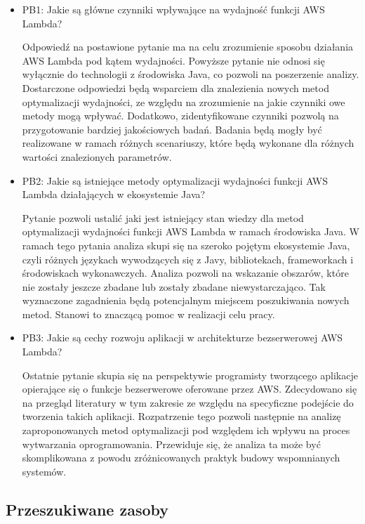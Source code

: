 \begin{itemize}
    \item PB1: Jakie są główne czynniki wpływające na wydajność funkcji AWS Lambda?
    
    Odpowiedź na postawione pytanie ma na celu zrozumienie sposobu działania AWS Lambda pod kątem wydajności.
    Powyższe pytanie nie odnosi się wyłącznie do technologii z środowiska Java, co pozwoli na poszerzenie analizy.
    Dostarczone odpowiedzi będą wsparciem dla znalezienia nowych metod optymalizacji wydajności, ze względu na zrozumienie na jakie czynniki owe metody mogą wpływać.
    Dodatkowo, zidentyfikowane czynniki pozwolą na przygotowanie bardziej jakościowych badań. 
    Badania będą mogły być realizowane w ramach różnych scenariuszy, które będą wykonane dla różnych wartości znalezionych parametrów.  

    \item PB2: Jakie są istniejące metody optymalizacji wydajności funkcji AWS Lambda działających w ekosystemie Java?
    
    Pytanie pozwoli ustalić jaki jest istniejący stan wiedzy dla metod optymalizacji wydajności funkcji AWS Lambda w ramach środowiska Java.
    W ramach tego pytania analiza skupi się na szeroko pojętym ekosystemie Java, czyli różnych językach wywodzących się z Javy, bibliotekach, frameworkach i środowiskach wykonawczych.
    Analiza pozwoli na wskazanie obszarów, które nie zostały jeszcze zbadane lub zostały zbadane niewystarczająco.
    Tak wyznaczone zagadnienia będą potencjalnym miejscem poszukiwania nowych metod.
    Stanowi to znaczącą pomoc w realizacji celu pracy.

    \item PB3: Jakie są cechy rozwoju aplikacji w architekturze bezserwerowej AWS Lambda?
    
    Ostatnie pytanie skupia się na perspektywie programisty tworzącego aplikacje opierające się o funkcje bezserwerowe oferowane przez AWS.
    Zdecydowano się na przegląd literatury w tym zakresie ze względu na specyficzne podejście do tworzenia takich aplikacji.
    Rozpatrzenie tego pozwoli następnie na analizę zaproponowanych metod optymalizacji pod względem ich wpływu na proces wytwarzania oprogramowania.
    Przewiduje się, że analiza ta może być skomplikowana z powodu zróżnicowanych praktyk budowy wspomnianych systemów.

\end{itemize}

\subsection{Przeszukiwane zasoby}\label{chapter:przeszukiwane_zasoby}

